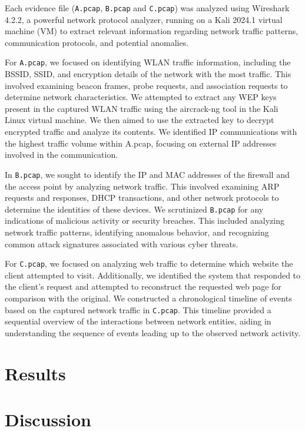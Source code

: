 \noindent Each evidence file (\texttt{A.pcap}, \texttt{B.pcap} and \texttt{C.pcap}) was analyzed using Wireshark 4.2.2, a powerful network protocol analyzer, running on a Kali 2024.1 virtual machine (VM) to extract relevant information regarding network traffic patterns, communication protocols, and potential anomalies. 
\newline

\noindent For \texttt{A.pcap}, we focused on identifying WLAN traffic information, including the BSSID, SSID, and encryption details of the network with the most traffic. This involved examining beacon frames, probe requests, and association requests to determine network characteristics. We attempted to extract any WEP keys present in the captured WLAN traffic using the aircrack-ng tool in the Kali Linux virtual machine. We then aimed to use the extracted key to decrypt encrypted traffic and analyze its contents. We identified IP communications with the highest traffic volume within A.pcap, focusing on external IP addresses involved in the communication.
\newline

\noindent In \texttt{B.pcap}, we sought to identify the IP and MAC addresses of the firewall and the access point by analyzing network traffic. This involved examining ARP requests and responses, DHCP transactions, and other network protocols to determine the identities of these devices. We scrutinized \texttt{B.pcap} for any indications of malicious activity or security breaches. This included analyzing network traffic patterns, identifying anomalous behavior, and recognizing common attack signatures associated with various cyber threats.
\newline

\noindent For \texttt{C.pcap}, we focused on analyzing web traffic to determine which website the client attempted to visit. Additionally, we identified the system that responded to the client's request and attempted to reconstruct the requested web page for comparison with the original. We constructed a chronological timeline of events based on the captured network traffic in \texttt{C.pcap}. This timeline provided a sequential overview of the interactions between network entities, aiding in understanding the sequence of events leading up to the observed network activity.


\section{Results}
\section{Discussion}